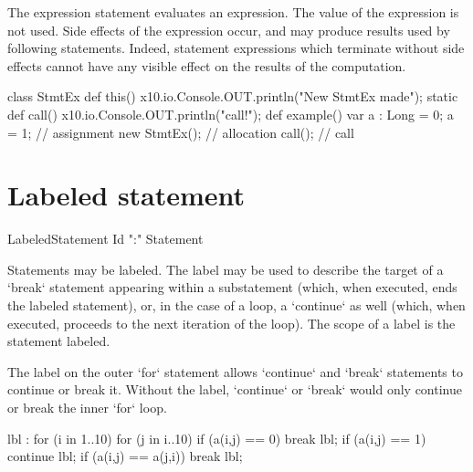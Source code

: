The expression statement evaluates an expression. The value of the expression
is not used. Side effects of the expression occur, and may produce results
used by following statements. Indeed, statement expressions which terminate
without side effects cannot have any visible effect on the results of the
computation. 


\begin{ex}
\begin{xten}
class StmtEx {
  def this() { 
     x10.io.Console.OUT.println("New StmtEx made");  }
  static def call() { 
     x10.io.Console.OUT.println("call!");}
  def example() {
     var a : Long = 0;
     a = 1; // assignment
     new StmtEx(); // allocation
     call(); // call
  }
}
\end{xten}
%
\end{ex}



\section{Labeled statement}


\begin{bbgrammar}
    LabeledStatement \: Id \xcd":" Statement 
\end{bbgrammar}


Statements may be labeled. The label may be used to describe the target of a
\xcd`break` statement appearing within a substatement (which, when executed,
ends the labeled statement), or, in the case of a loop, a \xcd`continue` as
well (which, when executed, proceeds to the next iteration of the loop). The
scope of a label is the statement labeled.

\begin{ex}
The label on the outer \xcd`for` statement allows \xcd`continue` and
\xcd`break` statements to continue or break it.  Without the label,
\xcd`continue` or \xcd`break` would only continue or break the inner \xcd`for`
loop. 
\begin{xten}
lbl : for (i in 1..10) {
   for (j in i..10) {  
      if (a(i,j) == 0) break lbl;
      if (a(i,j) == 1) continue lbl;
      if (a(i,j) == a(j,i)) break lbl;
   }
}
\end{xten}
\end{ex}


